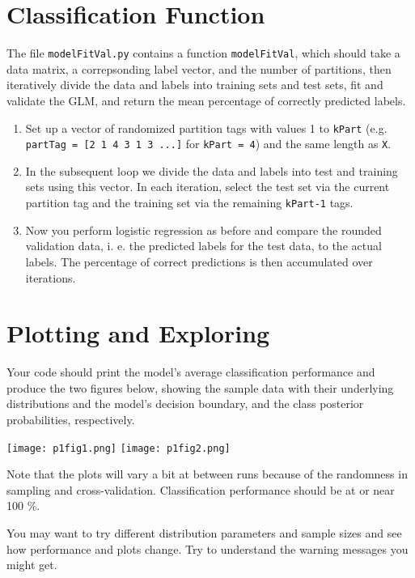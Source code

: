 \documentclass[10pt,a4paper,notitlepage]{report}
\begin{document}
\section*{Classification Function}
The file \texttt{modelFitVal.py} contains a function \texttt{modelFitVal}, which should take a data matrix, a correpsonding label vector, and the number of partitions, then iteratively divide the data and labels into training sets and test sets, fit and validate the GLM, and return the mean percentage of correctly predicted labels.

\begin{enumerate}
  \item Set up a vector of randomized partition tags with values 1 to \texttt{kPart} (e.g. \texttt{partTag = [2 1 4 3 1 3 ...]} for \texttt{kPart = 4}) and the same length as \texttt{X}.

  \item In the subsequent loop we divide the data and labels into test and training sets using this vector. In each iteration, select the test set via the current partition tag and the training set via the remaining \texttt{kPart-1} tags.

  \item Now you perform logistic regression as before and compare the rounded validation data, i. e. the predicted labels for the test data, to the actual labels. The percentage of correct predictions is then accumulated over iterations.
\end{enumerate}

\section*{Plotting and Exploring}
Your code should print the model's average classification performance and produce the two figures below, showing the sample data with their underlying distributions and the model's decision boundary, and the class posterior probabilities, respectively.

\texttt{[image: p1fig1.png]}
\texttt{[image: p1fig2.png]}

Note that the plots will vary a bit at between runs because of the randomness in sampling and cross-validation. Classification performance should be at or near 100 \%.

You may want to try different distribution parameters and sample sizes and see how performance and plots change. Try to understand the warning messages you might get.
\end{document}
